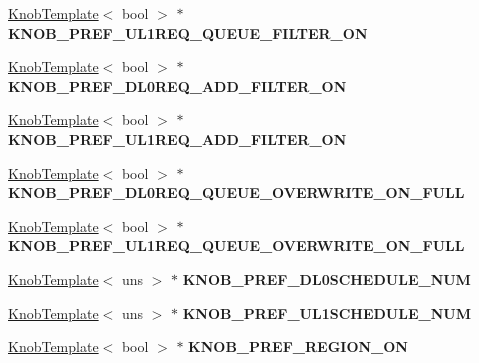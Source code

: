 \begin{DoxyCompactItemize}
\item 
\hypertarget{classall__knobs__c_ad78f7e2d5f59f387683413f383b0c48e}{
\hyperlink{classKnobTemplate}{KnobTemplate}$<$ bool $>$ $\ast$ {\bfseries KNOB\_\-PREF\_\-UL1REQ\_\-QUEUE\_\-FILTER\_\-ON}}
\label{classall__knobs__c_ad78f7e2d5f59f387683413f383b0c48e}

\item 
\hypertarget{classall__knobs__c_a55a91e27c777c389bd5e95e5833e386c}{
\hyperlink{classKnobTemplate}{KnobTemplate}$<$ bool $>$ $\ast$ {\bfseries KNOB\_\-PREF\_\-DL0REQ\_\-ADD\_\-FILTER\_\-ON}}
\label{classall__knobs__c_a55a91e27c777c389bd5e95e5833e386c}

\item 
\hypertarget{classall__knobs__c_a397d705b9cafd27635fe8f0c40b9e5cf}{
\hyperlink{classKnobTemplate}{KnobTemplate}$<$ bool $>$ $\ast$ {\bfseries KNOB\_\-PREF\_\-UL1REQ\_\-ADD\_\-FILTER\_\-ON}}
\label{classall__knobs__c_a397d705b9cafd27635fe8f0c40b9e5cf}

\item 
\hypertarget{classall__knobs__c_a7f2edf1fbe489278d2f214aafa5dfdd7}{
\hyperlink{classKnobTemplate}{KnobTemplate}$<$ bool $>$ $\ast$ {\bfseries KNOB\_\-PREF\_\-DL0REQ\_\-QUEUE\_\-OVERWRITE\_\-ON\_\-FULL}}
\label{classall__knobs__c_a7f2edf1fbe489278d2f214aafa5dfdd7}

\item 
\hypertarget{classall__knobs__c_abfdcea2b2edb03506484dc941291bb8d}{
\hyperlink{classKnobTemplate}{KnobTemplate}$<$ bool $>$ $\ast$ {\bfseries KNOB\_\-PREF\_\-UL1REQ\_\-QUEUE\_\-OVERWRITE\_\-ON\_\-FULL}}
\label{classall__knobs__c_abfdcea2b2edb03506484dc941291bb8d}

\item 
\hypertarget{classall__knobs__c_a0902772415f14955f8cae31246b76ba1}{
\hyperlink{classKnobTemplate}{KnobTemplate}$<$ uns $>$ $\ast$ {\bfseries KNOB\_\-PREF\_\-DL0SCHEDULE\_\-NUM}}
\label{classall__knobs__c_a0902772415f14955f8cae31246b76ba1}

\item 
\hypertarget{classall__knobs__c_a1bac572626b16219281df53b7bbdc474}{
\hyperlink{classKnobTemplate}{KnobTemplate}$<$ uns $>$ $\ast$ {\bfseries KNOB\_\-PREF\_\-UL1SCHEDULE\_\-NUM}}
\label{classall__knobs__c_a1bac572626b16219281df53b7bbdc474}

\item 
\hypertarget{classall__knobs__c_abad49ade29c1c37f21ded43c73154029}{
\hyperlink{classKnobTemplate}{KnobTemplate}$<$ bool $>$ $\ast$ {\bfseries KNOB\_\-PREF\_\-REGION\_\-ON}}
\label{classall__knobs__c_abad49ade29c1c37f21ded43c73154029}


\end{DoxyCompactItemize}
